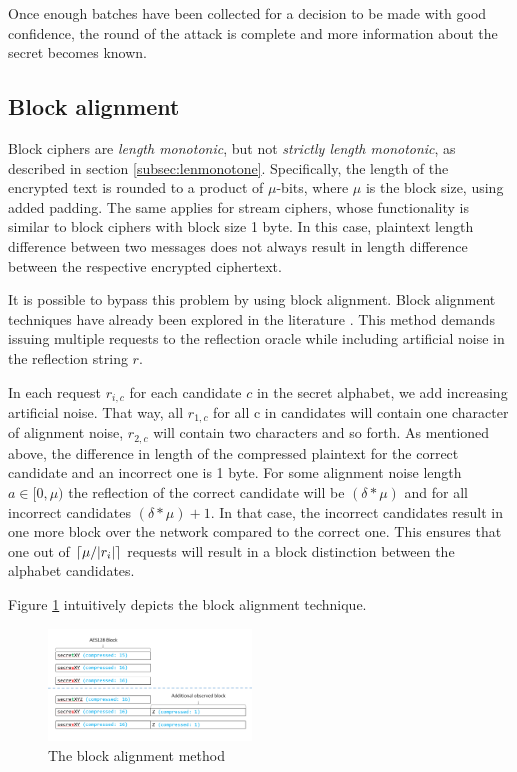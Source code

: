 \documentclass[conference, letterpaper, 10pt]{IEEEtran}
\DeclarePairedDelimiter{\ceil}{\lceil}{\rceil}
\begin{document}
Once enough batches have been collected for a decision to be made with good
confidence, the round of the attack is complete and more information about the
secret becomes known.

\subsection{Block alignment}\label{subsec:blockalign}
Block ciphers are \textit{length monotonic}, but not \textit{strictly length
monotonic}, as described in section \ref{subsec:lenmonotone}. Specifically, the
length of the encrypted text is rounded to a product of $\mu$-bits, where $\mu$
is the block size, using added padding. The same applies for stream ciphers,
whose functionality is similar to block ciphers with block size 1 byte. In this
case, plaintext length difference between two messages does not always result in
length difference between the respective encrypted ciphertext.

It is possible to bypass this problem by using block alignment. Block alignment
techniques have already been explored in the literature \cite{c14}. This method
demands issuing multiple requests to the reflection oracle while including
artificial noise in the reflection string $r$.

In each request $r_{i, c}$ for each candidate $c$ in the secret alphabet, we add
increasing artificial noise. That way, all $r_{1, c}$ for all c in candidates
will contain one character of alignment noise, $r_{2, c}$ will contain two
characters and so forth. As mentioned above, the difference in length of the
compressed plaintext for the correct candidate and an incorrect one is 1 byte.
For some alignment noise length $a \in [0, \mu)$ the reflection of the correct
candidate will be $(\delta*\mu)$ and for all incorrect candidates
$(\delta*\mu)+1$. In that case, the incorrect candidates result in one more
block over the network compared to the correct one.  This ensures that one out
of $\ceil{\mu / |r_i|}$ requests will result in a block distinction between the
alphabet candidates.

Figure \ref{fig:block_alignment} intuitively depicts the block alignment technique.

   \begin{figure}[thpb]
      \centering
          \includegraphics[width=0.48\textwidth]{block_alignment.png}
      \caption{The block alignment method}
      \label{fig:block_alignment}
   \end{figure}
\end{document}
